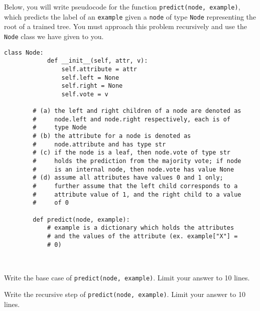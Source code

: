 \documentclass[11pt,addpoints,answers]{exam}
\newcommand \code [1]{{\tt #1}}
\begin{document}
\begin{questions}
\begin{parts}
    Below, you will write pseudocode for the function \lstinline{predict(node, example)}, which predicts the label of an \lstinline{example} given a \lstinline{node} of type \lstinline{Node} representing the root of a trained tree. You must approach this problem recursively and use the \code{Node} class we have given to you. 
    
        \begin{lstlisting}[escapechar=@]
        class Node:
            def __init__(self, attr, v):
                self.attribute = attr
                self.left = None
                self.right = None
                self.vote = v
            
        # (a) the left and right children of a node are denoted as
        #     node.left and node.right respectively, each is of 
        #     type Node
        # (b) the attribute for a node is denoted as
        #     node.attribute and has type str
        # (c) if the node is a leaf, then node.vote of type str
        #     holds the prediction from the majority vote; if node 
        #     is an internal node, then node.vote has value None
        # (d) assume all attributes have values 0 and 1 only;
        #     further assume that the left child corresponds to a
        #     attribute value of 1, and the right child to a value 
        #     of 0
        
        def predict(node, example):
            # example is a dictionary which holds the attributes
            # and the values of the attribute (ex. example["X"] =
            # 0)
            
                    
        \end{lstlisting}
        \begin{subparts}
        \subpart[3] Write the base case of \lstinline{predict(node, example)}. Limit your answer to 10 lines. \\
        \begin{your_solution}[title=Your Answer,height=5.1cm,width=15cm]
            
        \begin{your_code_solution}
        
        \end{your_code_solution}
            
            
        \end{your_solution}
        
        \subpart[3] Write the recursive step of \lstinline{predict(node, example)}.  Limit your answer to 10 lines. \\
        \begin{your_solution}[title=Your Answer,height=5.5cm,width=15cm]
            

\end{your_solution}
\end{subparts}
\end{parts}
\end{questions}
\end{document}

